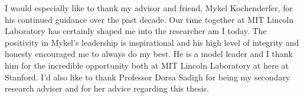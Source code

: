 
I would especially like to thank my advisor and friend, Mykel Kochenderfer, for his continued guidance over the past decade.
Our time together at MIT Lincoln Laboratory has certainly shaped me into the researcher am I today.
The positivity in Mykel's leadership is inspirational and his high level of integrity and honesty encouraged me to always do my best.
He is a model leader and I thank him for the incredible opportunity both at MIT Lincoln Laboratory at here at Stanford.
I'd also like to thank Professor Dorsa Sadigh for being my secondary research adviser and for her advice regarding this thesis.

